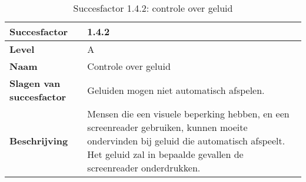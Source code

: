 \begin{table}[H]
    \centering
    \caption{Succesfactor 1.4.2: controle over geluid}
    \hspace*{-1cm}\begin{tabular}{|l|p{12cm}|} 
        \hline
        \textbf{Succesfactor}                 & 1.4.2                                                                                                                                                                                                                                                                                                                                                                                                                                                                                                            \\ 
        \hline
        \textbf{Level}                        & A                                                                                                                                                                                                                                                                                                                                                                                                                                                                                                                 \\ 
        \hline
        \textbf{Naam}                         & Controle over geluid~                                                                                                                                                                                                                                                                                                                                                                                                                                                                                      \\ 
        \hline
        \textbf{Slagen van succesfactor}      & Geluiden mogen niet automatisch afspelen.                                                                                                                                                                                                                              \\ 
        \hline
        \textbf{Beschrijving}                 & Mensen die een visuele beperking hebben, en een screenreader gebruiken, kunnen moeite ondervinden bij geluid die automatisch afspeelt. Het geluid zal in bepaalde gevallen de screenreader onderdrukken.  \\ 

\end{tabular}
\end{table}
